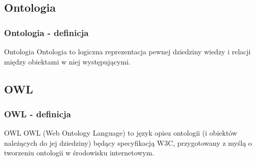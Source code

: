 \documentclass{beamer}
\begin{document}
\subsection{Ontologia}
\begin{frame}
  \frametitle{Ontologia - definicja}
\begin{block}{Ontologia}
Ontologia to logiczna reprezentacja pewnej dziedziny wiedzy i relacji między obiektami w niej występującymi. 
\end{block}
\end{frame}


\subsection{OWL}

\begin{frame}
  \frametitle{OWL - definicja}
 \begin{block}{OWL}
 OWL (Web Ontology Language) to język opisu ontologii (i obiektów należących do jej dziedziny) będący specyfikacją W3C, przygotowany z myślą o tworzeniu ontologii w środowisku internetowym.
\end{block}
\end{frame}
\end{document}
